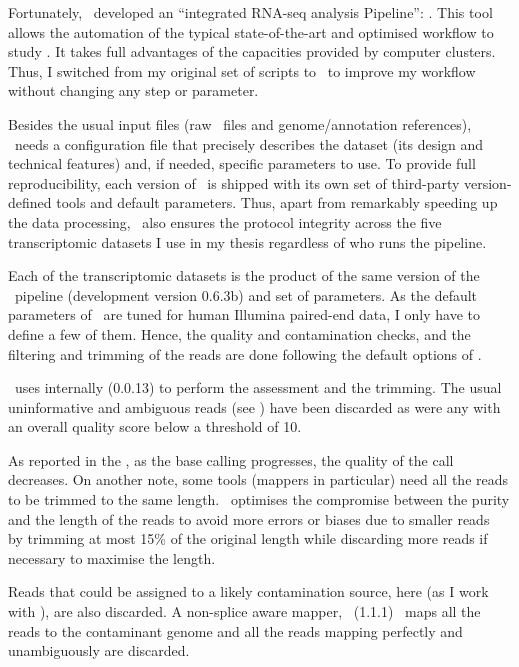 Fortunately, \nuno\ developed
an \enquote{integrated RNA-seq analysis Pipeline}:
.
This tool allows the automation of the typical
state-of-the-art and optimised workflow to study
\Rnaseq. It takes full advantages of the capacities provided by computer clusters.
Thus, I switched from my original set of scripts to \irap\
to improve my workflow without changing any step or parameter.

Besides the usual input files (raw \Rnaseq\ files and genome/annotation
references), \irap\ needs a configuration file that precisely describes the
dataset (its design and technical features) and, if needed, specific parameters
to use.
To provide full reproducibility,
each version of \irap\ is shipped with
its own set of third-party version-defined tools and default parameters.
Thus, apart from remarkably speeding up the data processing,
\irap\ also ensures the protocol integrity
across the five transcriptomic datasets I use
in my thesis regardless of who runs the pipeline.

Each of the transcriptomic datasets is the product of the same version of
the \irap\ pipeline (development version 0.6.3b) and set of parameters. As the
default parameters of \irap\ are tuned for human Illumina paired-end data,
I only have to define a few of them. Hence, the quality and contamination checks,
and the filtering and trimming of the reads are done following the default options
of \irap.

\irap\ uses internally
 (0.0.13)
to perform the
assessment and the trimming. The usual uninformative and ambiguous reads
(see \Crefu{subsub:trim})
have been discarded as were any with an overall quality score below
a threshold of 10.

As reported in the , as the base calling progresses,
the quality of the call decreases.
On another note, some tools (mappers in particular) need
all the reads to be trimmed to the same length. \irap\ optimises the compromise
between the purity and the length of the reads to avoid more errors or
biases due to smaller reads~\mycite{Trimwisely} by trimming at most 15\% of the
original length while discarding more reads if necessary to maximise the length.

Reads that could be assigned to a likely contamination source, here
\species{Escherichia coli} (as I work with \species{Homo sapiens}),
are also discarded. A non-splice aware mapper,
~(1.1.1)~
maps all the reads to the
contaminant genome and all the reads mapping perfectly and unambiguously are
discarded.

